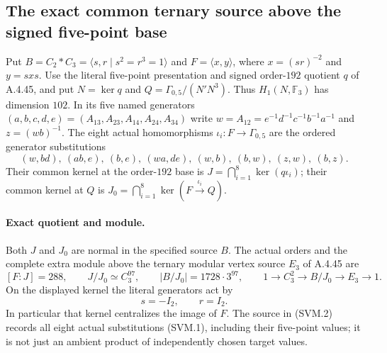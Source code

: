\subsection{The exact common ternary source above the signed five-point base}

Put $B=C_2*C_3=\langle s,r\mid s^2=r^3=1\rangle$ and
$F=\langle x,y\rangle$, where $x=(sr)^{-2}$ and $y=sxs$.
Use the literal five-point presentation and signed order-$192$ quotient
$q$ of A.4.45, and put $N=\ker q$ and
$Q=\Gamma_{0,5}/(N'N^3)$.  Thus
$H_1(N,\mathbb F_3)$ has dimension $102$.  In its five named generators
$(a,b,c,d,e)=(A_{13},A_{23},A_{14},A_{24},A_{34})$ write
$w=A_{12}=e^{-1}d^{-1}c^{-1}b^{-1}a^{-1}$ and $z=(wb)^{-1}$.
The eight actual homomorphisms $\iota_i:F\to\Gamma_{0,5}$ are the
ordered generator substitutions
\[
 (w,bd),\ (ab,e),\ (b,e),\ (wa,de),\ (w,b),\ (b,w),\ (z,w),\ (b,z).
                                                               \tag{SVM.1}
\]
Their common kernel at the order-$192$ base is
$J=\bigcap_{i=1}^8\ker(q\iota_i)$; their common kernel at $Q$ is
$J_0=\bigcap_{i=1}^8\ker(F\xrightarrow{\iota_i}Q)$.

\paragraph{Exact quotient and module.}
Both $J$ and $J_0$ are normal in the specified source $B$.  The actual
orders and the complete extra module above the ternary modular vertex
source $E_3$ of A.4.45 are
\[
 [F:J]=288,\qquad J/J_0\simeq C_3^{97},\qquad
 |B/J_0|=1728\cdot3^{97},\qquad
 1\longrightarrow C_3^2\longrightarrow B/J_0
     \longrightarrow E_3\longrightarrow1.
                                                               \tag{SVM.2}
\]
On the displayed kernel the literal generators act by
\[
                          s=-I_2,\qquad r=I_2.
                                                               \tag{SVM.3}
\]
In particular that kernel centralizes the image of $F$.
The source in (SVM.2) records all eight actual substitutions (SVM.1),
including their five-point values; it is not just an ambient product
of independently chosen target values.


